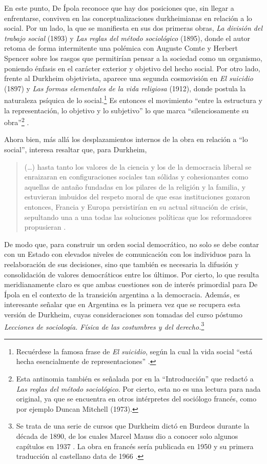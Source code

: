 En este punto, De Ípola reconoce que hay dos posiciones que, sin llegar a enfrentarse, conviven en las conceptualizaciones durkheimianas en relación a lo social. Por un lado, la que se manifiesta en sus dos primeras obras, \emph{La división del trabajo social} (1893) y \emph{Las reglas del método sociológico} (1895), donde el autor retoma de forma intermitente una polémica con Auguste Comte y Herbert Spencer sobre los rasgos que permitirían pensar a la sociedad como un organismo, poniendo énfasis en el carácter exterior y objetivo del hecho social. Por otro lado, frente al Durkheim objetivista, aparece una segunda cosmovisión en \emph{El suicidio} (1897) y \emph{Las formas elementales de la vida religiosa} (1912), donde postula la naturaleza psíquica de lo social.\footnote{Recuérdese la famosa frase de \emph{El suicidio}, según la cual la vida social \enquote{está hecha esencialmente de representaciones} \parencite[429]{1617-DURKHEIM2006}.} Es entonces el movimiento \enquote{entre la estructura y la representación, lo objetivo y lo subjetivo} lo que marca \enquote{silenciosamente su obra}\footnote{Esta antinomia también es señalada por \textcite{1618-DEIPOLA2012} en la \enquote{Introducción} que redactó a \emph{Las reglas del método sociológico}. Por cierto, esta no es una lectura para nada original, ya que se encuentra en otros intérpretes del sociólogo francés, como por ejemplo Duncan Mitchell (1973).} \parencite[44]{1592-DEIPOLA1997}.

Ahora bien, más allá los desplazamientos internos de la obra en relación a \enquote{lo social}, interesa resaltar que, para Durkheim,

\begin{quote}
(\dots) hasta tanto los valores de la ciencia y los de la democracia liberal se enraizaran en configuraciones sociales tan sólidas y cohesionantes como aquellas de antaño fundadas en los pilares de la religión y la familia, y estuvieran imbuidos del respeto moral de que esas instituciones gozaron entonces, Francia y Europa persistirían en su actual situación de crisis, sepultando una a una todas las soluciones políticas que los reformadores propusieran \parencite[46]{1592-DEIPOLA1997}.
\end{quote}

De modo que, para construir un orden social democrático, no solo se debe contar con un Estado con elevados niveles de comunicación con los individuos para la reelaboración de sus decisiones, sino que también es necesaria la difusión y consolidación de valores democráticos entre los últimos. Por cierto, lo que resulta meridianamente claro es que ambas cuestiones son de interés primordial para De Ípola en el contexto de la transición argentina a la democracia. Además, es interesante señalar que en Argentina es la primera vez que se recupera esta versión de Durkheim, cuyas consideraciones son tomadas del curso póstumo \emph{Lecciones de sociología. Física de las costumbres y del derecho.}\footnote{Se trata de una serie de cursos que Durkheim dictó en Burdeos durante la década de 1890, de los cuales Marcel Mauss dio a conocer solo algunos capítulos en 1937 \parencite{1443-BOUGLE1938}. La obra en francés sería publicada en 1950 y su primera traducción al castellano data de 1966 \parencite{1449-CATANO1998}.}

